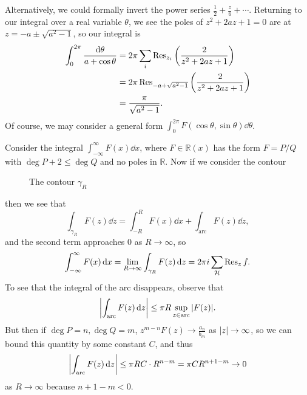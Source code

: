 \documentclass[leqno, openany]{memoir}
\theoremstyle{definition}
\theoremstyle{remark}
\theoremstyle{plain}
\theoremstyle{definition}
\theoremstyle{remark}
\newcommand{\R}{\mathbb{R}}
\newcommand{\mc}[1]{\mathcal{#1}}
\begin{document}
Alternatively, we could formally invert the power series $\frac{1}{2} +
\frac{z}{6} + \cdots$. Returning to our integral over a real variable $\theta$,
we see the poles of $z^2 + 2 az + 1 = 0$ are at $z = -a \pm \sqrt{a^2-1}$, so
our integral is \begin{align*} \int_0^{2 \pi} \frac{\dd{\theta}}{a + \cos
\theta} &= 2 \pi \sum_{i} \Res_{z_i} \qty(\frac{2}{z^2 + 2az + 1}) \\ &= 2 \pi
\Res_{-a+\sqrt{a^2-1}} \qty(\frac{2}{z^2 + 2az + 1}) \\ &=
\frac{\pi}{\sqrt{a^2-1}}.  \end{align*} Of course, we may consider a general
form $\int_0^{2 \pi} F(\cos \theta, \sin \theta) \dd{\theta}$.

Consider the integral $\int_{-\infty}^{\infty} F(x) \dd{x}$, where $F \in
\R(x)$ has the form $F = P/Q$ with $\deg P + 2 \leq \deg Q$ and no poles in
$\R$. Now if we consider the contour \begin{figure}[H] \begin{center}
     \end{center} \caption{The contour
        $\gamma_R$}%
        \end{figure} then we see that \[
        \int_{\gamma_R} F(z) \dd{z} = \int_{-R}^R F(x) \dd{x} +
        \int_{\text{arc}} F(z) \dd{z}, \] and the second term approaches $0$ as
        $R \to \infty$, so \[ \int_{- \infty}^{\infty} F(x) \dd{x} = \lim_{R
        \to \infty} \int_{\gamma_R} F(z) \dd{z} = 2 \pi i \sum_{\mc{H}} \Res_z
    f. \] To see that the integral of the arc disappears, observe that \[
\abs{\int_{\text{arc}} F(z) \dd{z}} \leq \pi R \sup_{z \in \text{arc}}
\abs{F(z)}. \] But then if $\deg P = n, \deg Q = m$, $z^{m-n} F(z) \to
\frac{a_n}{b_m}$ as $\abs{z} \to \infty$, so we can bound this quantity by some
constant $C$, and thus \[ \abs{\int_{\text{arc}} F(z) \dd{z}} \leq \pi R C
\cdot R^{n-m} = \pi C R^{n+1-m} \to 0 \] as $R \to \infty$ because $n+1-m < 0$.
\end{document}
